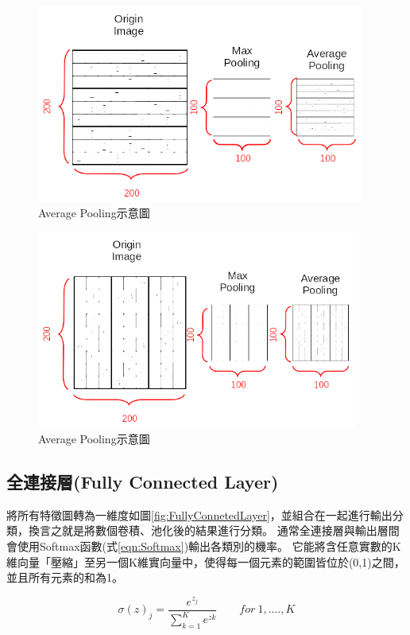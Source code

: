 \begin{figure}[H]
	\centerline{\includegraphics[height=6.5cm]{./pic/iAAoojSF.png}}
	\caption{Average Pooling示意圖}
	\label{fig:Kernel1WithPooling}
\end{figure}

\begin{figure}[H]
	\centerline{\includegraphics[height=6.5cm]{./pic/f61oy3eL.png}}
	\caption{Average Pooling示意圖}
	\label{fig:Kernel2WithPooling}
\end{figure}

\subsection{全連接層(Fully Connected Layer)}
將所有特徵圖轉為一維度如圖\ref{fig:FullyConnetedLayer}，並組合在一起進行輸出分類，換言之就是將數個卷積、池化後的結果進行分類。
通常全連接層與輸出層間會使用Softmax函數(式\ref{eqn:Softmax})輸出各類別的機率。
它能將含任意實數的K維向量「壓縮」至另一個K維實向量中，使得每一個元素的範圍皆位於(0,1)之間，並且所有元素的和為1。

\begin{equation}
	\label{eqn:Softmax}
	\sigma(z)_j=\frac{e^{z_j}}{\sum_{k=1}^{K}e^{zk}} \ \ \ \ \ \ \ \ \ for\ 1,....,K
\end{equation}

